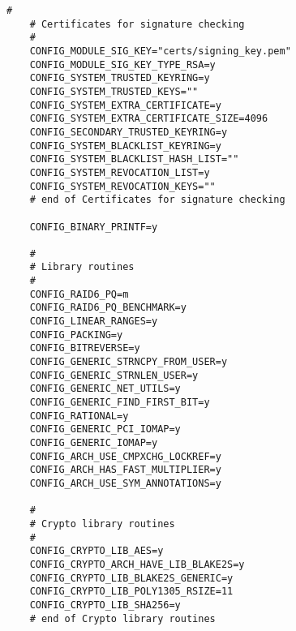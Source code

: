 \begin{multicols}{2}
\begin{lstlisting}[caption=kernel config,label=kconfig,]
    #
    # Certificates for signature checking
    #
    CONFIG_MODULE_SIG_KEY="certs/signing_key.pem"
    CONFIG_MODULE_SIG_KEY_TYPE_RSA=y
    CONFIG_SYSTEM_TRUSTED_KEYRING=y
    CONFIG_SYSTEM_TRUSTED_KEYS=""
    CONFIG_SYSTEM_EXTRA_CERTIFICATE=y
    CONFIG_SYSTEM_EXTRA_CERTIFICATE_SIZE=4096
    CONFIG_SECONDARY_TRUSTED_KEYRING=y
    CONFIG_SYSTEM_BLACKLIST_KEYRING=y
    CONFIG_SYSTEM_BLACKLIST_HASH_LIST=""
    CONFIG_SYSTEM_REVOCATION_LIST=y
    CONFIG_SYSTEM_REVOCATION_KEYS=""
    # end of Certificates for signature checking
    
    CONFIG_BINARY_PRINTF=y
    
    #
    # Library routines
    #
    CONFIG_RAID6_PQ=m
    CONFIG_RAID6_PQ_BENCHMARK=y
    CONFIG_LINEAR_RANGES=y
    CONFIG_PACKING=y
    CONFIG_BITREVERSE=y
    CONFIG_GENERIC_STRNCPY_FROM_USER=y
    CONFIG_GENERIC_STRNLEN_USER=y
    CONFIG_GENERIC_NET_UTILS=y
    CONFIG_GENERIC_FIND_FIRST_BIT=y
    CONFIG_RATIONAL=y
    CONFIG_GENERIC_PCI_IOMAP=y
    CONFIG_GENERIC_IOMAP=y
    CONFIG_ARCH_USE_CMPXCHG_LOCKREF=y
    CONFIG_ARCH_HAS_FAST_MULTIPLIER=y
    CONFIG_ARCH_USE_SYM_ANNOTATIONS=y
    
    #
    # Crypto library routines
    #
    CONFIG_CRYPTO_LIB_AES=y
    CONFIG_CRYPTO_ARCH_HAVE_LIB_BLAKE2S=y
    CONFIG_CRYPTO_LIB_BLAKE2S_GENERIC=y
    CONFIG_CRYPTO_LIB_POLY1305_RSIZE=11
    CONFIG_CRYPTO_LIB_SHA256=y
    # end of Crypto library routines
    

\end{lstlisting}
\end{multicols}
